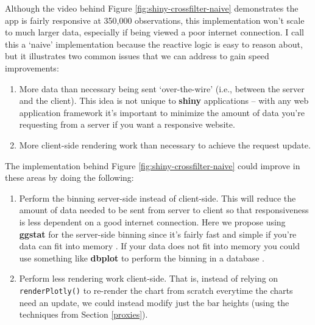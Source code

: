 \documentclass[
  12pt,
]{krantz}
\providecommand{\tightlist}{%
  \setlength{\itemsep}{0pt}\setlength{\parskip}{0pt}}
\begin{document}
Although the video behind Figure \ref{fig:shiny-crossfilter-naive} demonstrates the app is fairly responsive at 350,000 observations, this implementation won't scale to much larger data, especially if being viewed a poor internet connection. I call this a `naive' implementation because the reactive logic is easy to reason about, but it illustrates two common issues that we can address to gain speed improvements:

\begin{enumerate}
\def\labelenumi{\arabic{enumi}.}
\tightlist
\item
  More data than necessary being sent `over-the-wire' (i.e., between the server and the client). This idea is not unique to \textbf{shiny} applications -- with any web application framework it's important to minimize the amount of data you're requesting from a server if you want a responsive website.
\item
  More client-side rendering work than necessary to achieve the request update.
\end{enumerate}

The implementation behind Figure \ref{fig:shiny-crossfilter-naive} could improve in these areas by doing the following:

\begin{enumerate}
\def\labelenumi{\arabic{enumi}.}
\tightlist
\item
  Perform the binning server-side instead of client-side. This will reduce the amount of data needed to be sent from server to client so that responsiveness is less dependent on a good internet connection. Here we propose using \textbf{ggstat} for the server-side binning since it's fairly fast and simple if you're data can fit into memory \citep{ggstat}. If your data does not fit into memory you could use something like \textbf{dbplot} to perform the binning in a database \citep{dbplot}.
\item
  Perform less rendering work client-side. That is, instead of relying on \texttt{renderPlotly()} to re-render the chart from scratch everytime the charts need an update, we could instead modify just the bar heights (using the techniques from Section \ref{proxies}).
\end{enumerate}
\end{document}
